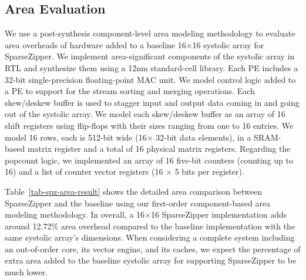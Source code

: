 \subsection{Area Evaluation}


We use a post-synthesis component-level area modeling methodology to evaluate
area overheads of hardware added to a baseline 16$\times$16 systolic array for
SparseZipper.
We implement area-significant components of the systolic array in RTL and
synthesize them using a 12nm standard-cell library.
Each PE includes a 32-bit single-precision floating-point MAC unit.
We model control logic added to a PE to support for the stream sorting and
merging operations.
Each skew/deskew buffer is used to stagger input and output data coming in and
going out of the systolic array.
We model each skew/deskew buffer as an array of 16 shift registers using
flip-flops with their sizes ranging from one to 16 entries.
We model 16 rows, each is 512-bit wide (16$\times$ 32-bit data elements), in a
SRAM-based matrix register and a total of 16 physical matrix registers.
Regarding the popcount logic, we implemented an array of 16 five-bit counters
(counting up to 16) and a list of counter vector registers (16 $\times$ 5 bits
per register).

Table~\ref{tab-spz-area-result} shows the detailed area comparison between
SparseZipper and the baseline using our first-order component-based area
modeling methodology.
In overall, a 16$\times$16 SparseZipper implementation adds around 12.72\% area
overhead compared to the baseline implementation with the same systolic array's
dimensions.
When considering a complete system including an out-of-order core, its vector
engine, and its caches, we expect the percentage of extra area added to the
baseline systolic array for supporting SparseZipper to be much lower.
